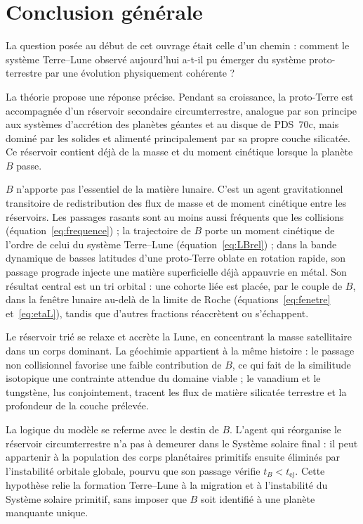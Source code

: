 \documentclass[11pt,a4paper,openany]{report}
\begin{document}
\chapter*{Conclusion générale}

La question posée au début de cet ouvrage était celle d'un chemin : comment le système
Terre--Lune observé aujourd'hui a-t-il pu émerger du système proto-terrestre par une évolution
physiquement cohérente ?

La théorie propose une réponse précise. Pendant sa croissance, la proto-Terre est accompagnée
d'un réservoir secondaire circumterrestre, analogue par son principe aux systèmes d'accrétion des
planètes géantes et au disque de PDS~70c, mais dominé par les solides et alimenté principalement
par sa propre couche silicatée. Ce réservoir contient déjà de la masse et du moment cinétique
lorsque la planète $B$ passe.

$B$ n'apporte pas l'essentiel de la matière lunaire. C'est un agent
gravitationnel transitoire de redistribution des flux de masse et de moment cinétique entre les
réservoirs. Les passages rasants sont au moins aussi fréquents que les collisions
(équation~\eqref{eq:frequence}) ; la trajectoire de $B$ porte un moment cinétique de l'ordre de celui
du système Terre--Lune (équation~\eqref{eq:LBrel}) ; dans la bande dynamique de basses latitudes d'une proto-Terre
oblate en rotation rapide, son passage prograde injecte une matière superficielle déjà appauvrie
en métal. Son résultat central est un tri orbital : une cohorte liée est placée, par le couple de $B$,
dans la fenêtre lunaire au-delà de la limite de Roche (équations~\eqref{eq:fenetre}
et~\eqref{eq:etaL}), tandis que d'autres fractions réaccrètent ou s'échappent.

Le réservoir trié se relaxe et accrète la Lune, en concentrant la masse satellitaire dans un corps
dominant. La géochimie appartient à la même histoire : le passage non collisionnel favorise une
faible contribution de $B$, ce qui fait de la similitude isotopique une contrainte attendue du
domaine viable ; le vanadium et le tungstène, lus conjointement, tracent les flux de matière
silicatée terrestre et la profondeur de la couche prélevée.

La logique du modèle se referme avec le destin de $B$. L'agent qui réorganise le réservoir
circumterrestre n'a pas à demeurer dans le Système solaire final : il peut appartenir à la population
des corps planétaires primitifs ensuite éliminés par l'instabilité orbitale globale, pourvu que son
passage vérifie $t_B<t_{\mathrm{ej}}$. Cette hypothèse relie la formation Terre--Lune à la migration
et à l'instabilité du Système solaire primitif, sans imposer que $B$ soit identifié à une planète
manquante unique.
\end{document}
